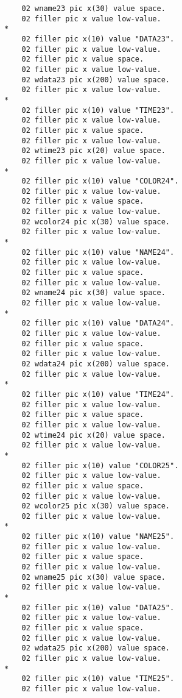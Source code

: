 {{{\begin{verbatim}
          02 wname23 pic x(30) value space.
          02 filler pic x value low-value.
      *    
          02 filler pic x(10) value "DATA23".
          02 filler pic x value low-value.
          02 filler pic x value space.
          02 filler pic x value low-value.
          02 wdata23 pic x(200) value space.
          02 filler pic x value low-value.
      *    
          02 filler pic x(10) value "TIME23".
          02 filler pic x value low-value.
          02 filler pic x value space.
          02 filler pic x value low-value.
          02 wtime23 pic x(20) value space.
          02 filler pic x value low-value.
      *    
          02 filler pic x(10) value "COLOR24".
          02 filler pic x value low-value.
          02 filler pic x value space.
          02 filler pic x value low-value.
          02 wcolor24 pic x(30) value space.
          02 filler pic x value low-value.
      *    
          02 filler pic x(10) value "NAME24".
          02 filler pic x value low-value.
          02 filler pic x value space.
          02 filler pic x value low-value.
          02 wname24 pic x(30) value space.
          02 filler pic x value low-value.
      *    
          02 filler pic x(10) value "DATA24".
          02 filler pic x value low-value.
          02 filler pic x value space.
          02 filler pic x value low-value.
          02 wdata24 pic x(200) value space.
          02 filler pic x value low-value.
      *    
          02 filler pic x(10) value "TIME24".
          02 filler pic x value low-value.
          02 filler pic x value space.
          02 filler pic x value low-value.
          02 wtime24 pic x(20) value space.
          02 filler pic x value low-value.
      *    
          02 filler pic x(10) value "COLOR25".
          02 filler pic x value low-value.
          02 filler pic x value space.
          02 filler pic x value low-value.
          02 wcolor25 pic x(30) value space.
          02 filler pic x value low-value.
      *    
          02 filler pic x(10) value "NAME25".
          02 filler pic x value low-value.
          02 filler pic x value space.
          02 filler pic x value low-value.
          02 wname25 pic x(30) value space.
          02 filler pic x value low-value.
      *    
          02 filler pic x(10) value "DATA25".
          02 filler pic x value low-value.
          02 filler pic x value space.
          02 filler pic x value low-value.
          02 wdata25 pic x(200) value space.
          02 filler pic x value low-value.
      *    
          02 filler pic x(10) value "TIME25".
          02 filler pic x value low-value.

\end{verbatim}}}}
